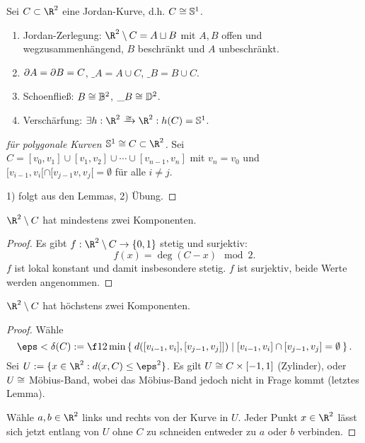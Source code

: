 \begin{st}
	Sei $C \subset \R^2$ eine Jordan-Kurve, d.h. $C \cong \mathbb{S}^1$.
	\begin{enumerate}[1)]
		\item
			Jordan-Zerlegung: $\R^2 \setminus C = A \dunion B$ mit $A, B$ offen und wegzusammenhängend, $B$ beschränkt und $A$ unbeschränkt.
		\item
			$\partial A = \partial B = C$, $\_A = A \cup C$, $\_B = B\cup C$.
		\item
			Schoenfließ: $B \cong \mathbb{B}^2$, $\_B \cong \mathbb{D}^2$.
		\item
			Verschärfung: $\exists h: \R^2 \homeomorphicto \R^2: h(C) = \S^1$.
	\end{enumerate}
	\begin{proof}[für polygonale Kurven $\S^1 \homeomorphic C \subset \R^2$]
		Sei $C = [v_0, v_1] \cup [v_1, v_2] \cup \dotsb \cup [v_{n-1}, v_n]$ mit $v_n = v_0$ und $[v_{i-1}, v_i[ \cap [v_{j-1} v, v_j[ = \emptyset$ für alle $i \neq j$.

		1) folgt aus den Lemmas, 2) Übung.
	\end{proof}
\end{st}

\begin{lem}
	$\R^2 \setminus C$ hat mindestens zwei Komponenten.
	\begin{proof}
		Es gibt $f: \R^2 \setminus C \to \{0,1\}$ stetig und surjektiv:
		\[
			f(x) = \deg(C - x) \mod 2.
		\]
		$f$ ist lokal konstant und damit insbesondere stetig.
		$f$ ist surjektiv, beide Werte werden angenommen.
	\end{proof}
\end{lem}

\begin{lem}
	$\R^2 \setminus C$ hat höchstens zwei Komponenten.
	\begin{proof}
		Wähle
		\[
			\eps < \delta(C) := \f 12 \min \Set{ d([v_{i-1}, v_i], [v_{j-1}, v_j]]) | [v_{i-1}, v_i] \cap [v_{j-1}, v_j] = \emptyset }.
		\]
		Sei $U := \{ x \in \R^2 : d(x, C) \le \eps^2 \}$.
		Es gilt $U \cong C \times [-1, 1]$ (Zylinder), oder $U \cong$ Möbius-Band, wobei das Möbius-Band jedoch nicht in Frage kommt (letztes Lemma).

		Wähle $a, b \in \R^2$ links und rechts von der Kurve in $U$.
		Jeder Punkt $x \in \R^2$ lässt sich jetzt entlang von $U$ ohne $C$ zu schneiden entweder zu $a$ oder $b$ verbinden.
	\end{proof}
\end{lem}

